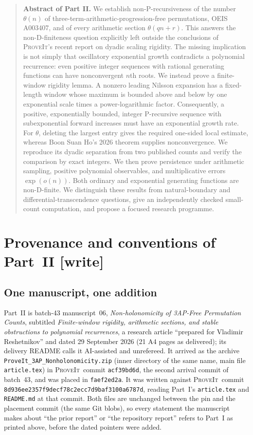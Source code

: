 \documentclass[11pt,a4paper]{article}
\numberwithin{equation}{section}
\theoremstyle{definition}
\theoremstyle{remark}
\newcommand{\repo}{\textsc{ProveIt}}
\newcommand{\wtag}{\textup{[write]}}
\newcommand{\lean}[1]{\nolinkurl{#1}}
\newcommand{\tht}{\theta}
\theoremstyle{definition}
\theoremstyle{plain}
\begin{document}
\begin{quote}\small
\textbf{Abstract of Part II.}
We establish non-P-recursiveness of the number $\tht(n)$ of
three-term-arithmetic-progression-free permutations, OEIS A003407, and of
every arithmetic section $\tht(qn+r)$. This answers the non-D-finiteness
question explicitly left outside the conclusions of \repo's recent report
on dyadic scaling rigidity. The missing implication is not simply that
oscillatory exponential growth contradicts a polynomial recurrence: even
positive integer sequences with rational generating functions can have
nonconvergent $n$th roots. We instead prove a finite-window rigidity lemma.
A nonzero leading Nilsson expansion has a fixed-length window whose maximum
is bounded above and below by one exponential scale times a power-logarithmic
factor. Consequently, a positive, exponentially bounded, integer P-recursive
sequence with subexponential forward increases must have an exponential
growth rate. For $\tht$, deleting the largest entry gives the required
one-sided local estimate, whereas Boon Suan Ho's 2026 theorem supplies
nonconvergence. We reproduce its dyadic separation from two published counts
and verify the comparison by exact integers. We then prove persistence under
arithmetic sampling, positive polynomial observables, and multiplicative
errors $\exp(o(n))$. Both ordinary and exponential generating functions are
non-D-finite. We distinguish these results from natural-boundary and
differential-transcendence questions, give an independently checked
small-count computation, and propose a focused research programme.
\end{quote}

\section{Provenance and conventions of Part~II \wtag}
\label{dsr:nh:sec:provenance}

\subsection{One manuscript, one addition}
\label{dsr:nh:sec:source}
Part~II is batch-43 manuscript~06, \emph{Non-holonomicity of 3AP-Free
Permutation Counts}, subtitled \emph{Finite-window rigidity, arithmetic
sections, and stable obstructions to polynomial recurrences}, a research
article ``prepared for Vladimir Reshetnikov'' and dated 29 September 2026
(21 A4 pages as delivered); its delivery README calls it AI-assisted and
unrefereed. It arrived as the archive
\lean{ProveIt_3AP_Nonholonomicity.zip} (inner directory of the same name,
main file \lean{article.tex}) in \repo\ commit \lean{acf39bd6d}, the
second arrival commit of batch~43, and was placed in \lean{faef2ed2a}. It
was written against \repo\ commit
\lean{8d936ee2357f9decf78c2ecc7d9baf3100a6787d}, reading Part~I's
\lean{article.tex} and \lean{README.md} at that commit. Both files are
unchanged between the pin and the placement commit (the same Git blobs), so
every statement the manuscript makes about ``the prior report'' or ``the
repository report'' refers to Part~I as printed above, before the dated
pointers were added.
\end{document}
